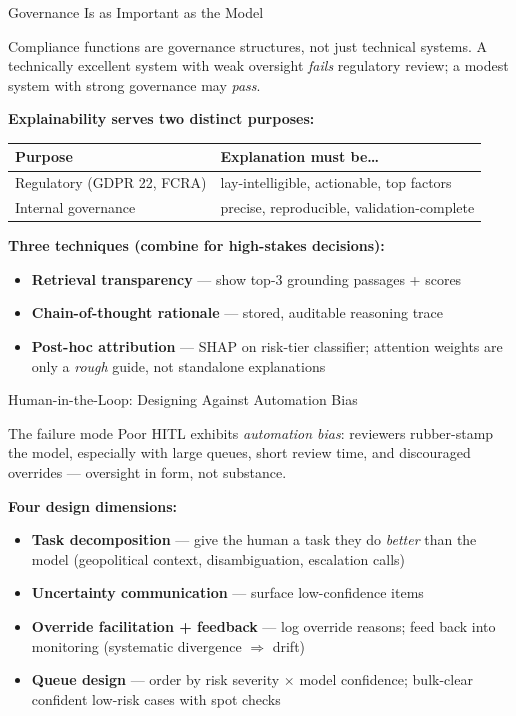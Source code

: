 \documentclass[9pt,t]{beamer}
\begin{document}
\begin{frame}{Governance Is as Important as the Model}
\begin{bigpicture}
Compliance functions are governance structures, not just technical systems. A
technically excellent system with weak oversight \emph{fails} regulatory review;
a modest system with strong governance may \emph{pass}.
\end{bigpicture}

\medskip
\textbf{Explainability serves two distinct purposes:}
\begin{tabular}{ll}
\toprule
\textbf{Purpose} & \textbf{Explanation must be\dots} \\
\midrule
Regulatory (GDPR 22, FCRA) & lay-intelligible, actionable, top factors \\
Internal governance & precise, reproducible, validation-complete \\
\bottomrule
\end{tabular}

\medskip
\textbf{Three techniques (combine for high-stakes decisions):}
\begin{itemize}\footnotesize
  \item \textbf{Retrieval transparency} --- show top-3 grounding passages + scores
  \item \textbf{Chain-of-thought rationale} --- stored, auditable reasoning trace
  \item \textbf{Post-hoc attribution} --- SHAP on risk-tier classifier; attention
        weights are only a \emph{rough} guide, not standalone explanations
\end{itemize}
\end{frame}

\begin{frame}{Human-in-the-Loop: Designing Against Automation Bias}
\begin{alertblock}{The failure mode}
Poor HITL exhibits \emph{automation bias}: reviewers rubber-stamp the model,
especially with large queues, short review time, and discouraged overrides ---
oversight in form, not substance.
\end{alertblock}

\medskip
\textbf{Four design dimensions:}
\begin{itemize}
  \item \textbf{Task decomposition} --- give the human a task they do \emph{better}
        than the model (geopolitical context, disambiguation, escalation calls)
  \item \textbf{Uncertainty communication} --- surface low-confidence items
  \item \textbf{Override facilitation + feedback} --- log override reasons; feed
        back into monitoring (systematic divergence $\Rightarrow$ drift)
  \item \textbf{Queue design} --- order by risk severity $\times$ model confidence;
        bulk-clear confident low-risk cases with spot checks
\end{itemize}
\end{frame}
\end{document}

